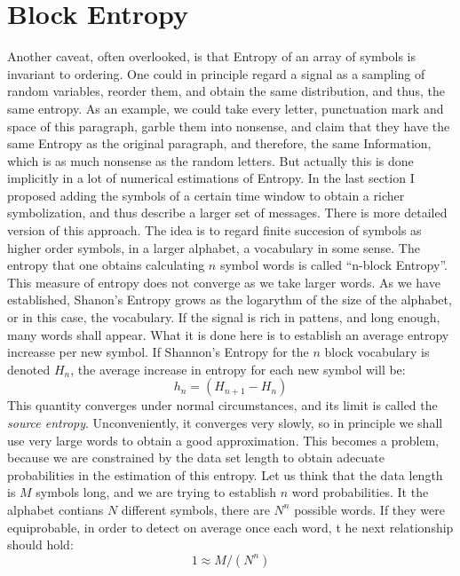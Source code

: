 \documentclass[10pt]{article}
\begin{document}
\section{Block Entropy}

Another caveat, often overlooked, is that Entropy of an array of symbols is invariant to ordering. One could in principle regard a signal as a sampling of random variables, reorder them, and obtain the same distribution, and thus, the same entropy. As an example, we could take every letter, punctuation mark and space of this paragraph, garble them into nonsense, and claim that they have the same Entropy as the original paragraph, and therefore, the same Information, which is as much nonsense as the random letters. But actually this is done implicitly in a lot of numerical estimations of Entropy. In the last section
I proposed adding the symbols of a certain time window to obtain a richer symbolization,
and thus describe a larger set of messages. There is more detailed version
of this approach. The idea is to regard finite succesion of symbols as
higher order symbols, in a larger alphabet, a vocabulary in some sense. The entropy
that one obtains calculating $n$ symbol words is called ``n-block Entropy''.
This measure of entropy does not converge as we take larger words. As we have
established, Shanon's Entropy grows as the logarythm of the size of the
alphabet, or in this case, the vocabulary. If the signal is rich in pattens, and
long enough, many words shall appear. What it is done here is to establish
an average entropy increasse per new symbol. If Shannon's Entropy for the $n$ block
vocabulary is denoted $H_n$, the average increase in entropy for each new symbol
will be:
\begin{equation}
    h_n=(H_{n+1}-H_n)    
\end{equation}
This quantity converges under normal circumstances, and its limit is called
the \emph{source entropy}. Unconveniently, it converges very slowly, so in principle
we shall use very large words to obtain a good approximation. This becomes a
problem, because we are constrained by the data set length to obtain adecuate
probabilities in the estimation of this entropy. Let us
think that the data length is $M$ symbols
long, and we are trying to establish $n$ word probabilities. It the alphabet
contians $N$ different symbols, there are $N^n$ possible words. If they were
equiprobable, in order to detect on average once each word, t
he next relationship should hold:
\begin{equation}
  1 \approx M/(N^n)
\end{equation}
\end{document}
